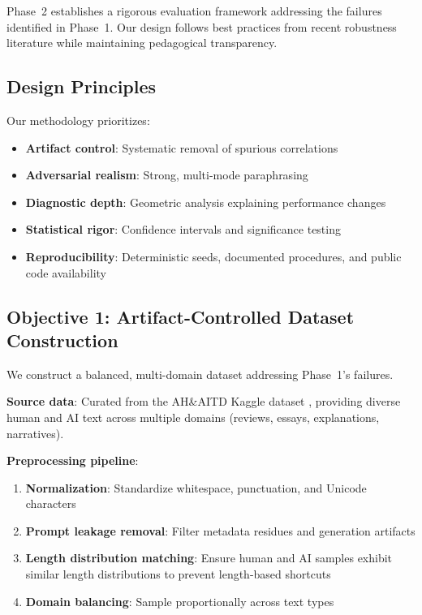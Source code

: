 \documentclass[conference]{IEEEtran}
\begin{document}
Phase~2 establishes a rigorous evaluation framework addressing the failures identified in Phase~1. Our design follows best practices from recent robustness literature \cite{sadasivan2023can,krishna2023paraphrasing,zha2024padben} while maintaining pedagogical transparency.

\subsection{Design Principles}

Our methodology prioritizes:
\begin{itemize}
    \item \textbf{Artifact control}: Systematic removal of spurious correlations
    \item \textbf{Adversarial realism}: Strong, multi-mode paraphrasing
    \item \textbf{Diagnostic depth}: Geometric analysis explaining performance changes
    \item \textbf{Statistical rigor}: Confidence intervals and significance testing
    \item \textbf{Reproducibility}: Deterministic seeds, documented procedures, and public code availability
\end{itemize}

\subsection{Objective 1: Artifact-Controlled Dataset Construction}

We construct a balanced, multi-domain dataset addressing Phase~1's failures.

\textbf{Source data}: Curated from the AH\&AITD Kaggle dataset \cite{akram2023human}, providing diverse human and AI text across multiple domains (reviews, essays, explanations, narratives).

\textbf{Preprocessing pipeline}:
\begin{enumerate}
    \item \textbf{Normalization}: Standardize whitespace, punctuation, and Unicode characters
    \item \textbf{Prompt leakage removal}: Filter metadata residues and generation artifacts
    \item \textbf{Length distribution matching}: Ensure human and AI samples exhibit similar length distributions to prevent length-based shortcuts
    \item \textbf{Domain balancing}: Sample proportionally across text types
\end{enumerate}
\end{document}
